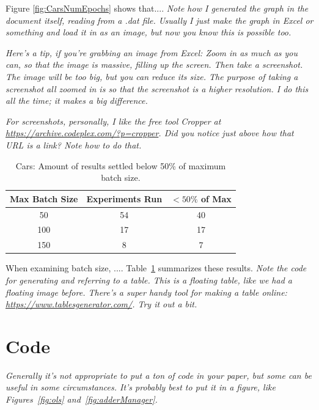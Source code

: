\documentclass[twocolumn,letterpaper,10pt]{article}
\begin{document}
Figure \ref{fig:CarsNumEpochs} shows that.... {\it Note how I generated the graph in the document itself, reading from a .dat file. Usually I just make the graph in Excel or something and load it in as an image, but now you know this is possible too.}

{\it Here's a tip, if you're grabbing an image from Excel: Zoom in as much as you can, so that the image is massive, filling up the screen. Then take a screenshot. The image will be too big, but you can reduce its size. The purpose of taking a screenshot all zoomed in is so that the screenshot is a higher resolution. I do this all the time; it makes a big difference.}

{\it For screenshots, personally, I like the free tool Cropper at \url{https://archive.codeplex.com/?p=cropper}. Did you notice just above how that URL is a link? Note how to do that.}

\begin{table}
\caption{Cars: Amount of results settled below 50\% of maximum batch size.}
\label{tbl:CarsBatchSize}
\centering
\begin{tabular}{c c c}
\hline
Max Batch Size & Experiments Run & $<50\%$ of Max \\
\hline
50 & 54 & 40 \\
100 & 17 & 17 \\
150 & 8 & 7 \\
\hline
\end{tabular}
\end{table}

When examining batch size, .... Table~\ref{tbl:CarsBatchSize} summarizes these results. {\it Note the code for generating and referring to a table. This is a floating table, like we had a floating image before. There's a super handy tool for making a table online: \url{https://www.tablesgenerator.com/}. Try it out a bit.}

\section{Code}

{\it Generally it's not appropriate to put a ton of code in your paper, but some can be useful in some circumstances. It's probably best to put it in a figure, like Figures~\ref{fig:ols} and~\ref{fig:adderManager}.}
\end{document}
